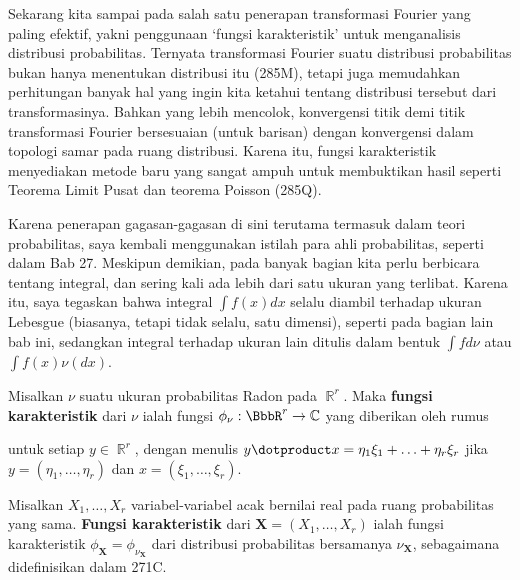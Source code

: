 
\def\chaptername{Analisis Fourier}
\def\sectionname{Fungsi karakteristik}


Sekarang kita sampai pada salah satu penerapan transformasi Fourier yang paling
efektif, yakni penggunaan `fungsi karakteristik' untuk menganalisis distribusi
probabilitas. Ternyata transformasi Fourier suatu distribusi probabilitas bukan
hanya menentukan distribusi itu (285M), tetapi juga memudahkan perhitungan
banyak hal yang ingin kita ketahui tentang distribusi tersebut dari
transformasinya. Bahkan yang lebih mencolok, konvergensi
titik demi titik transformasi Fourier bersesuaian (untuk barisan) dengan
konvergensi dalam topologi samar pada ruang distribusi. Karena itu, fungsi
karakteristik menyediakan metode baru yang sangat ampuh untuk membuktikan hasil
seperti Teorema Limit Pusat dan teorema Poisson (285Q).

Karena penerapan gagasan-gagasan di sini terutama termasuk dalam teori
probabilitas, saya kembali menggunakan istilah para ahli probabilitas, seperti
dalam Bab 27. Meskipun demikian, pada banyak bagian kita perlu berbicara tentang
integral, dan sering kali ada lebih dari satu ukuran yang terlibat. Karena itu,
saya tegaskan bahwa integral $\int f(x)dx$ selalu diambil terhadap ukuran
Lebesgue (biasanya, tetapi tidak selalu, satu dimensi), seperti pada bagian lain
bab ini, sedangkan integral terhadap ukuran lain ditulis dalam bentuk
$\int fd\nu$ atau $\int f(x)\nu(dx)$.

 Misalkan $\nu$ suatu ukuran probabilitas Radon pada
$\BbbR^r$. Maka {\bf fungsi karakteristik}
dari $\nu$ ialah fungsi $\phi_{\nu}:\BbbR^r\to\Bbb C$ yang diberikan oleh rumus


\noindent untuk setiap $y\in\BbbR^r$, dengan menulis
$y\dotproduct x=\eta_1\xi_1+\ldots+\eta_r\xi_r$ jika
$y=(\eta_1,\ldots,\eta_r)$ dan $x=(\xi_1,\ldots,\xi_r)$.

 Misalkan $X_1,\ldots,X_r$ variabel-variabel acak
bernilai real pada ruang probabilitas yang sama. {\bf Fungsi karakteristik}
dari $\pmb{X}=(X_1,\ldots,X_r)$ ialah fungsi karakteristik
$\phi_{\pmb{X}}=\phi_{\nu_{\pmb{X}}}$ dari distribusi probabilitas bersamanya
$\nu_{\pmb{X}}$, sebagaimana didefinisikan dalam 271C.

